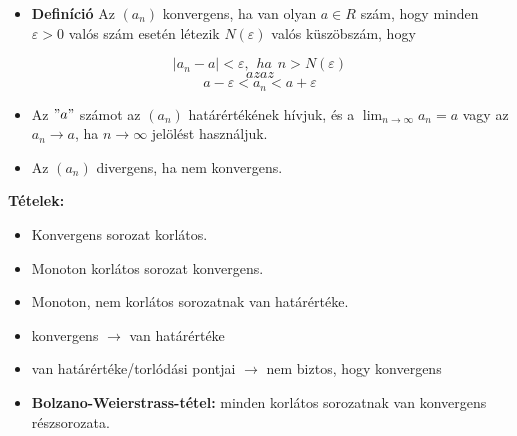 \documentclass[12pt,a4paper]{article}
\begin{document}
\begin{tcolorbox}[colback=green!5!white,colframe=green!60!black,title= 2. Konvergens{,} divergens sorozat]
    \begin{itemize}
        \item \textbf{Definíció} Az \((a_n)\) konvergens, ha van olyan \(a \in R\) szám, hogy minden \(\varepsilon > 0\) valós szám esetén létezik \(N(\varepsilon)\) valós küszöbszám, hogy
    \end{itemize}
        $$\left\lvert a_n -a\right\rvert < \varepsilon,\hspace{5pt}ha\hspace{5pt}n > N(\varepsilon)$$
        $$azaz$$
        $$a- \varepsilon < a_n< a+\varepsilon$$
    \begin{itemize}
        \item Az \("a"\) számot az \((a_n)\) határértékének hívjuk, és a \(\lim_{n \to \infty} a_n = a\)  vagy az \(a_n \to a\), ha \(n \to \infty \) jelölést használjuk.
        \item Az \((a_n)\) divergens, ha nem konvergens.
    \end{itemize}
\textbf{Tételek:}
\begin{itemize}
    \item Konvergens sorozat korlátos.
    \item Monoton korlátos sorozat konvergens.
    \item Monoton, nem korlátos sorozatnak van határértéke.
    \item konvergens \(\rightarrow\) van határértéke
    \item van határértéke/torlódási pontjai \(\rightarrow\) nem biztos, hogy konvergens
    \item \textbf{Bolzano-Weierstrass-tétel:} minden korlátos sorozatnak van konvergens részsorozata.
\end{itemize}
\end{tcolorbox}
\end{document}
